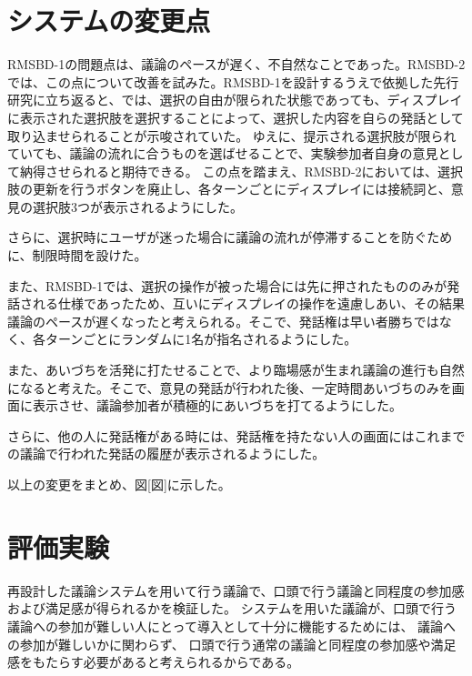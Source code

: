 \documentclass[11pt, a4paper]{jreport} %
\begin{document}
\section{システムの変更点}
RMSBD-1の問題点は、議論のペースが遅く、不自然なことであった。RMSBD-2では、この点について改善を試みた。RMSBD-1を設計するうえで依拠した先行研究に立ち返ると、\cite{渡辺美紀2017}では、選択の自由が限られた状態であっても、ディスプレイに表示された選択肢を選択することによって、選択した内容を自らの発話として取り込ませられることが示唆されていた。
ゆえに、提示される選択肢が限られていても、議論の流れに合うものを選ばせることで、実験参加者自身の意見として納得させられると期待できる。
この点を踏まえ、RMSBD-2においては、選択肢の更新を行うボタンを廃止し、各ターンごとにディスプレイには接続詞と、意見の選択肢3つが表示されるようにした。

さらに、選択時にユーザが迷った場合に議論の流れが停滞することを防ぐために、制限時間を設けた。


また、RMSBD-1では、選択の操作が被った場合には先に押されたもののみが発話される仕様であったため、互いにディスプレイの操作を遠慮しあい、その結果議論のペースが遅くなったと考えられる。そこで、発話権は早い者勝ちではなく、各ターンごとにランダムに1名が指名されるようにした。


また、あいづちを活発に打たせることで、より臨場感が生まれ議論の進行も自然になると考えた。そこで、意見の発話が行われた後、一定時間あいづちのみを画面に表示させ、議論参加者が積極的にあいづちを打てるようにした。


さらに、他の人に発話権がある時には、発話権を持たない人の画面にはこれまでの議論で行われた発話の履歴が表示されるようにした。


以上の変更をまとめ、図[図]に示した。



\section{評価実験}
再設計した議論システムを用いて行う議論で、口頭で行う議論と同程度の参加感および満足感が得られるかを検証した。
システムを用いた議論が、口頭で行う議論への参加が難しい人にとって導入として十分に機能するためには、
議論への参加が難しいかに関わらず、
口頭で行う通常の議論と同程度の参加感や満足感をもたらす必要があると考えられるからである。
\end{document}
